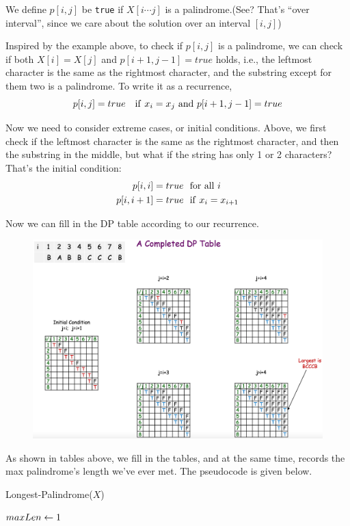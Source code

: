 \begin{spacing}{1.3}
    We define $p[i,j]$ be {\tt true} if $X[i\cdots j]$ is a palindrome.(See? 
    That's ``over interval'', since we care about the solution over an interval $[i,j]$)

    Inspired by the example above, to check if $p[i,j]$ is a palindrome, we can check 
    if both $X[i]=X[j]$ and $p[i+1, j-1]=true$ holds, i.e., the leftmost character is 
    the same as the rightmost character, and the substring except for them two 
    is a palindrome. To write it as a recurrence,
    $$p[i,j]=true\ \ \   {\rm if\ } x_i=x_j {\ \rm and\ } p[i+1, j-1]=true$$

    Now we need to consider extreme cases, or initial conditions. Above, we first 
    check if the leftmost character is the same as the rightmost character, and then 
    the substring in the middle, but what if the string has only 1 or 2 characters?
    That's the initial condition:
    \begin{align*}
        p[i,i] = true &\ \   {\rm for \ all}\ i\\ 
        p[i, i+1] = true &\ \   {\rm if \ } x_i=x_{i+1}
    \end{align*}

    Now we can fill in the DP table according to our recurrence.
    \begin{figure}[htbp]
        \centering
        \includegraphics[scale=0.37]{images/10-palin-table.png}
    \end{figure}

    As shown in tables above, we fill in the tables, and at the same time, 
    records the max palindrome's length we've ever met.
    The pseudocode is given below.
    \begin{algorithm*}[htbp]
        \caption{Longest-Palindrome($X$)}
        $maxLen\leftarrow 1$\qquad {}


\end{algorithm*}
\end{spacing}
